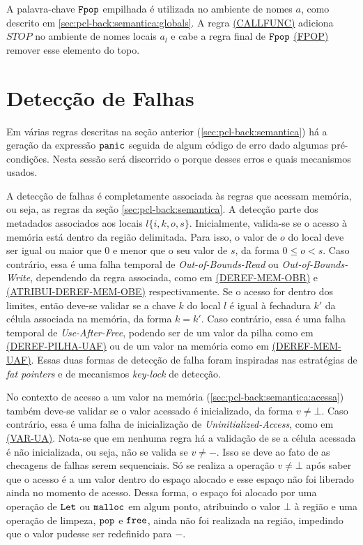 
A palavra-chave $\texttt{Fpop}$ empilhada é utilizada no ambiente de nomes $a$, como descrito em \ref{sec:pcl-back:semantica:globals}. A regra \hyperref[rule:callfunc]{(CALLFUNC)} adiciona $STOP$ no ambiente de nomes locais $a_l$ e cabe a regra final de $\texttt{Fpop}$ \hyperref[rule:fpop]{(FPOP)} remover esse elemento do topo.

\section{Detecção de Falhas}
\label{sec:pcl-back:errors}

Em várias regras descritas na seção anterior (\ref{sec:pcl-back:semantica}) há a geração da expressão $\texttt{panic}$ seguida de algum código de erro dado algumas pré-condições. Nesta sessão será discorrido o porque desses erros e quais mecanismos usados. 

A detecção de falhas é completamente associada às regras que acessam memória, ou seja, as regras da seção \ref{sec:pcl-back:semantica}. A detecção parte dos metadados associados aos locais $l\{i, k, o, s\}$. Inicialmente, valida-se se o acesso à memória está dentro da região delimitada. Para isso, o valor de $o$ do local deve ser igual ou maior que 0 e menor que o seu valor de $s$, da forma $ 0 \le o < s$. Caso contrário, essa é uma falha temporal de \emph{Out-of-Bounds-Read} ou \emph{Out-of-Bounds-Write}, dependendo da regra associada, como em \hyperref[rule:deref-mem-obr]{(DEREF-MEM-OBR)} e \hyperref[rule:atribui-deref-mem-obe]{(ATRIBUI-DEREF-MEM-OBE)} respectivamente. Se o acesso for dentro dos limites, então deve-se validar se a chave $k$ do local $l$ é igual à fechadura $k'$ da célula associada na memória, da forma $k = k'$. Caso contrário, essa é uma falha temporal de \emph{Use-After-Free}, podendo ser de um valor da pilha como em \hyperref[rule:deref-pilha-uaf]{(DEREF-PILHA-UAF)} ou de um valor na memória como em \hyperref[rule:deref-mem-uaf]{(DEREF-MEM-UAF)}. Essas duas formas de detecção de falha foram inspiradas nas estratégias de \emph{fat pointers} e de mecanismos \emph{key-lock} de detecção.

No contexto de acesso a um valor na memória (\ref{sec:pcl-back:semantica:acessa}) também deve-se validar se o valor acessado é inicializado, da forma $v \neq \bot$. Caso contrário, essa é uma falha de inicialização de \emph{Uninitialized-Access}, como em \hyperref[rule:var-ua]{(VAR-UA)}. Nota-se que em nenhuma regra há a validação de se a célula acessada é não inicializada, ou seja, não se valida se $v \neq -$. Isso se deve ao fato de as checagens de falhas serem sequenciais. Só se realiza a operação $v \neq \bot$ após saber que o acesso é a um valor dentro do espaço alocado e esse espaço não foi liberado ainda no momento de acesso. Dessa forma, o espaço foi alocado por uma operação de $\texttt{Let}$ ou $\texttt{malloc}$ em algum ponto, atribuindo o valor $\bot$ à região e uma operação de limpeza, $\texttt{pop}$ e $\texttt{free}$, ainda não foi realizada na região, impedindo que o valor pudesse ser redefinido para $-$.

